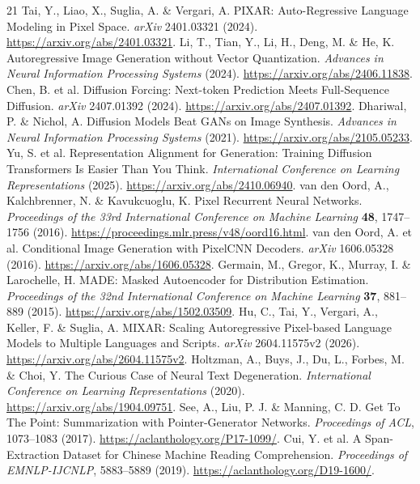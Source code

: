 \begin{thebibliography}{21}
\small
{}
 Tai, Y., Liao, X., Suglia, A. \& Vergari, A. PIXAR: Auto-Regressive Language Modeling in Pixel Space. \emph{arXiv} 2401.03321 (2024). \url{https://arxiv.org/abs/2401.03321}.
 Li, T., Tian, Y., Li, H., Deng, M. \& He, K. Autoregressive Image Generation without Vector Quantization. \emph{Advances in Neural Information Processing Systems} (2024). \url{https://arxiv.org/abs/2406.11838}.
 Chen, B. et al. Diffusion Forcing: Next-token Prediction Meets Full-Sequence Diffusion. \emph{arXiv} 2407.01392 (2024). \url{https://arxiv.org/abs/2407.01392}.
 Dhariwal, P. \& Nichol, A. Diffusion Models Beat GANs on Image Synthesis. \emph{Advances in Neural Information Processing Systems} (2021). \url{https://arxiv.org/abs/2105.05233}.
 Yu, S. et al. Representation Alignment for Generation: Training Diffusion Transformers Is Easier Than You Think. \emph{International Conference on Learning Representations} (2025). \url{https://arxiv.org/abs/2410.06940}.
 van den Oord, A., Kalchbrenner, N. \& Kavukcuoglu, K. Pixel Recurrent Neural Networks. \emph{Proceedings of the 33rd International Conference on Machine Learning} \textbf{48}, 1747--1756 (2016). \url{https://proceedings.mlr.press/v48/oord16.html}.
 van den Oord, A. et al. Conditional Image Generation with PixelCNN Decoders. \emph{arXiv} 1606.05328 (2016). \url{https://arxiv.org/abs/1606.05328}.
 Germain, M., Gregor, K., Murray, I. \& Larochelle, H. MADE: Masked Autoencoder for Distribution Estimation. \emph{Proceedings of the 32nd International Conference on Machine Learning} \textbf{37}, 881--889 (2015). \url{https://arxiv.org/abs/1502.03509}.
 Hu, C., Tai, Y., Vergari, A., Keller, F. \& Suglia, A. MIXAR: Scaling Autoregressive Pixel-based Language Models to Multiple Languages and Scripts. \emph{arXiv} 2604.11575v2 (2026). \url{https://arxiv.org/abs/2604.11575v2}.
 Holtzman, A., Buys, J., Du, L., Forbes, M. \& Choi, Y. The Curious Case of Neural Text Degeneration. \emph{International Conference on Learning Representations} (2020). \url{https://arxiv.org/abs/1904.09751}.
 See, A., Liu, P. J. \& Manning, C. D. Get To The Point: Summarization with Pointer-Generator Networks. \emph{Proceedings of ACL}, 1073--1083 (2017). \url{https://aclanthology.org/P17-1099/}.
 Cui, Y. et al. A Span-Extraction Dataset for Chinese Machine Reading Comprehension. \emph{Proceedings of EMNLP-IJCNLP}, 5883--5889 (2019). \url{https://aclanthology.org/D19-1600/}.

\end{thebibliography}
